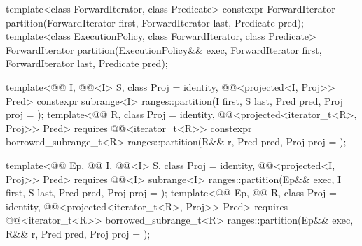 %
\begin{itemdecl}
template<class ForwardIterator, class Predicate>
  constexpr ForwardIterator
    partition(ForwardIterator first, ForwardIterator last, Predicate pred);
template<class ExecutionPolicy, class ForwardIterator, class Predicate>
  ForwardIterator
    partition(ExecutionPolicy&& exec, ForwardIterator first, ForwardIterator last, Predicate pred);

template<@@ I, @@<I> S, class Proj = identity,
         @@<projected<I, Proj>> Pred>
  constexpr subrange<I>
    ranges::partition(I first, S last, Pred pred, Proj proj = {});
template<@@ R, class Proj = identity,
         @@<projected<iterator_t<R>, Proj>> Pred>
  requires @@<iterator_t<R>>
  constexpr borrowed_subrange_t<R>
    ranges::partition(R&& r, Pred pred, Proj proj = {});

template<@@ Ep, @@ I, @@<I> S,
         class Proj = identity, @@<projected<I, Proj>> Pred>
  requires @@<I>
  subrange<I> ranges::partition(Ep&& exec, I first, S last, Pred pred, Proj proj = {});
template<@@ Ep, @@ R, class Proj = identity,
         @@<projected<iterator_t<R>, Proj>> Pred>
  requires @@<iterator_t<R>>
  borrowed_subrange_t<R> ranges::partition(Ep&& exec, R&& r, Pred pred, Proj proj = {});
\end{itemdecl}


